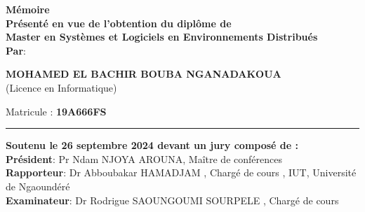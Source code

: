 \begin{titlepage}
\begin{center}
\vfill
\begin{center}
	\textbf{\large{Mémoire}} \\[0.2cm]
	\vspace{0.01cm}
	\textbf{\large{Présenté en vue de l'obtention du diplôme de} }\\[0.2cm]
	\textbf{\large{Master en Systèmes et Logiciels en Environnements Distribués}}\\[0.2cm]
	\textbf{\large{Par}}:\\[0.2cm]
	\begin{large}
		\textbf{MOHAMED EL BACHIR BOUBA NGANADAKOUA}\\[0.2cm]
		{\large (Licence en Informatique)}\\[0.2cm]
	\end{large}
	\begin{normalsize}
		\vspace{0.1cm}
		{\large Matricule} : \textbf{{\large 19A666FS}}\\
	\end{normalsize}
\end{center}
\vfill
\rule{\textwidth}{1pt}
\begin{center}
		\textbf{\large{Soutenu le 26 septembre 2024 devant un jury composé de :}} \\[0.2cm]
		\textbf{Président}: Pr Ndam NJOYA AROUNA, Maître de conférences \\[0.2cm]
		\textbf{Rapporteur}: Dr Abboubakar HAMADJAM , Chargé de cours , IUT, Université de Ngaoundéré \\[0.2cm]
		\textbf{Examinateur}: Dr Rodrigue SAOUNGOUMI SOURPELE , Chargé de cours\\[0.2cm]
\end{center}
\vfill


\end{center}
\end{titlepage}
